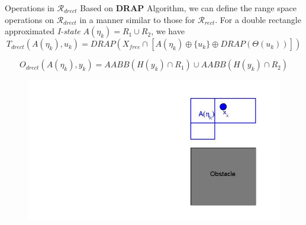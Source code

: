 

\begin{frame}{Operations in $\mathcal{R}_{drect}$}
  Based on \textbf{DRAP} Algorithm, we can define the range space operations on
  $\mathcal{R}_{drect}$ in a manner similar to those for $\mathcal{R}_{rect}$.
  For a double rectangle approximated \emph{I-state} $A(\eta_k) = R_1 \cup R_2$,
  we have
 $$ T_{drect}(A(\eta_k), u_k) = DRAP(X_{free} \cap [A(\eta_k) \oplus \{ u_k \} \oplus DRAP(\Theta(u_k))])$$

  $$O_{drect}(A(\eta_k), y_k) = AABB(H(y_k) \cap R_1)\cup AABB(H(y_k) \cap R_2)$$
  \begin{figure}
    \includegraphics[scale=0.3]{figs/drectevolve0.jpg}
  \end{figure}
\end{frame}

